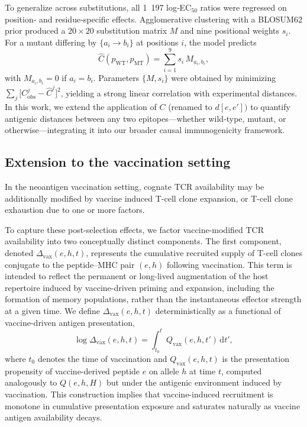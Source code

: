 \documentclass[11pt]{article}
\begin{document}
To generalize across substitutions, all 1 197 log‑EC\(_{50}\) ratios were regressed on position‑ and residue‑specific effects.  Agglomerative clustering with a BLOSUM62 prior produced a \(20\times20\) substitution matrix \(M\) and nine positional weights \(s_i\).  For a mutant differing by \(\{a_i\!\to\!b_i\}\) at positions \(i\), the model predicts
\begin{equation}
\label{eq:sum-distance}
\hat C(p_{\mathrm{WT}},p_{\mathrm{MT}})
=\sum_{i=1}^9 s_i\,M_{a_i,b_i},
\end{equation}
with \(M_{a_i,b_i}=0\) if \(a_i=b_i\).  Parameters \(\{M,s_i\}\) were obtained by minimizing \(\sum_j\bigl[C_{\mathrm{obs}}^j - \hat C^j\bigr]^2\), yielding a strong linear correlation with experimental distances. In this work, we extend the application of \(C\) (renamed to $d[e,e'])$ to quantify antigenic distances between any two epitopes—whether wild‑type, mutant, or otherwise—integrating it into our broader causal immunogenicity framework.

\subsection{Extension to the vaccination setting}
In the neoantigen vaccination setting, cognate TCR availability may be additionally modified by vaccine induced T-cell clone expansion, or T-cell clone exhaustion due to one or more factors. 

To capture these post-selection effects, we factor vaccine-modified TCR availability into two conceptually distinct components. The first component, denoted \(\Delta_{\mathrm{vax}}(e,h,t)\), represents the cumulative recruited supply of T-cell clones conjugate to the peptide–MHC pair \((e,h)\) following vaccination. This term is intended to reflect the permanent or long-lived augmentation of the host repertoire induced by vaccine-driven priming and expansion, including the formation of memory populations, rather than the instantaneous effector strength at a given time. We define \(\Delta_{\mathrm{vax}}(e,h,t)\) deterministically as a functional of vaccine-driven antigen presentation,
\begin{equation}
\log \Delta_{\mathrm{vax}}(e,h,t)
=
\int_{t_0}^{t} Q_{\mathrm{vax}}(e,h,t')\,\mathrm{d}t',
\label{eq:Delta_vax}
\end{equation}
where \(t_0\) denotes the time of vaccination and \(Q_{\mathrm{vax}}(e,h,t)\) is the presentation propensity of vaccine-derived peptide \(e\) on allele \(h\) at time \(t\), computed analogously to \(Q(e,h,H)\) but under the antigenic environment induced by vaccination. This construction implies that vaccine-induced recruitment is monotone in cumulative presentation exposure and saturates naturally as vaccine antigen availability decays.
\end{document}

